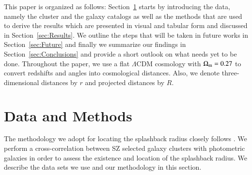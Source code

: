 \documentclass[iop, apjl, twocolappendix, numberedappendix]{emulateapj}
\begin{document}
This paper is organized as follows: Section~\ref{sec:Methods} starts
by introducing the data, namely the cluster and the galaxy catalogs
as well as the methods that are used to derive the results which are
presented in visual and tabular form and  discussed in
Section~\ref{sec:Results}. We outline the steps that will be taken
in future works in Section~\ref{sec:Future} and finally we summarize
our findings in Section~\ref{sec:Conclusions} and provide a short
outlook on what needs yet to be done. Throughout the paper, we use a
flat $\Lambda$CDM cosmology with $\Omega_{\rm m}=0.27$ to convert
redshifts and angles into cosmological distances. Also, we denote 
three-dimensional distances by $r$ and projected distances by $R$.


\section{Data and Methods}
\label{sec:Methods}
The methodology we adopt for locating the splashback radius closely
follows \citet{more2016detection}. We perform a cross-correlation
between SZ selected galaxy clusters with photometric galaxies in
order to assess the existence and location of the splashback radius.
We describe the data sets we use and our methodology in this
section.
\end{document}
